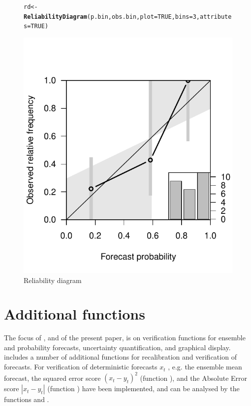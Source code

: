 \documentclass[article]{jss}\usepackage{graphicx, color}
\makeatletter
\def\maxwidth{ %
  \ifdim\Gin@nat@width>\linewidth
    \linewidth
  \else
    \Gin@nat@width
  \fi
}
\newcommand{\hlfunctioncall}[1]{\textcolor[rgb]{0,0.501960784313725,0.752941176470588}{\textbf{#1}}}%
\newenvironment{kframe}{%
 \def\at@end@of@kframe{}%
 \ifinner\ifhmode%
  \def\at@end@of@kframe{\end{minipage}}%
  \begin{minipage}{\columnwidth}%
 \fi\fi%
 \def\FrameCommand##1{\hskip\@totalleftmargin \hskip-\fboxsep
 \colorbox{shadecolor}{##1}\hskip-\fboxsep
     \hskip-\linewidth \hskip-\@totalleftmargin \hskip\columnwidth}%
 \MakeFramed {\advance\hsize-\width
   \@totalleftmargin\z@ \linewidth\hsize
   \@setminipage}}%
 {\par\unskip\endMakeFramed%
 \at@end@of@kframe}
\newenvironment{knitrout}{}{} %
\makeatother
\begin{document}
\begin{figure}
\begin{center}
%
\begin{knitrout}
\color{fgcolor}\begin{kframe}
\begin{alltt}
rd <- \hlfunctioncall{ReliabilityDiagram}(p.bin, obs.bin, plot=TRUE, bins=3, attributes=TRUE)
\end{alltt}
\end{kframe}
\includegraphics[width=\maxwidth]{figure/reldiag} 

\end{knitrout}

%
\end{center}
\caption{Reliability diagram}
\label{reldiag-plot}
\end{figure}


\section{Additional functions}

The focus of , and of the present paper, is on verification functions for ensemble and probability forecasts, uncertainty quantification, and graphical display.
 includes a number of additional functions for recalibration and verification of forecasts.
For verification of deterministic forecasts $x_t$ , e.g. the ensemble mean forecast, the squared error score $(x_t - y_t)^2$ (function ), and the Absolute Error score $|x_t - y_t|$ (function ) have been implemented, and can be analysed by the functions  and .
\end{document}
